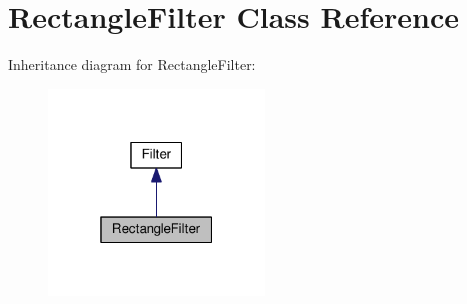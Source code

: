 \hypertarget{classModel_1_1RectangleFilter}{}\section{Rectangle\+Filter Class Reference}
\label{classModel_1_1RectangleFilter}


Inheritance diagram for Rectangle\+Filter\+:
\nopagebreak
\begin{figure}[H]
\begin{center}
\leavevmode
\includegraphics[width=163pt]{classModel_1_1RectangleFilter__inherit__graph}
\end{center}
\end{figure}
